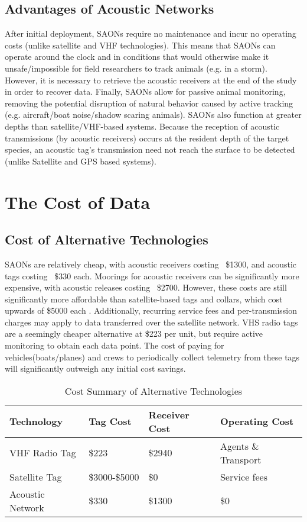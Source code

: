 \subsection{Advantages of Acoustic Networks}
After initial deployment, SAONs require no maintenance and incur no operating costs (unlike satellite and VHF technologies).  This means that SAONs can operate around the clock and in conditions that would otherwise make it unsafe/impossible for field researchers to track animals (e.g. in a storm)\cite{Heupel2006}.  However, it is necessary to retrieve the acoustic receivers at the end of the study in order to recover data\cite{Heupel2006}.  Finally, SAONs allow for passive animal monitoring, removing the potential disruption of natural behavior caused by active tracking (e.g. aircraft/boat noise/shadow scaring animals)\cite{Heupel2006}.  SAONs also function at greater depths than satellite/VHF-based systems.  Because the reception of acoustic transmissions (by acoustic receivers) occurs at the resident depth of the target species, an acoustic tag's transmission need not reach the surface to be detected (unlike Satellite and GPS based systems).

\section{The Cost of Data}
\subsection{Cost of Alternative Technologies}
SAONs are relatively cheap, with acoustic receivers costing ~\$1300, and acoustic tags costing ~\$330 each.  Moorings for acoustic receivers can be significantly more expensive, with acoustic releases costing ~\$2700.  However, these costs are still significantly more affordable than satellite-based tags and collars, which cost upwards of \$5000 each \cite{wildlifetracking}.  Additionally, recurring service fees and per-transmission charges may apply to data transferred over the satellite network.  VHS radio tags are a seemingly cheaper alternative at \$223 per unit, but require active monitoring to obtain each data point.  The cost of paying for vehicles(boats/planes) and crews to periodically collect telemetry from these tags will significantly outweigh any initial cost savings.

\begin{table}[h!]
		\begin{tabular}{l l l l}
Technology&Tag Cost&Receiver Cost&Operating Cost\\
\hline
			VHF Radio Tag		 & \$223\cite{telonicsFIS-550}           & \$2940\cite{telonicsTR-5}  & Agents \& Transport\\
			Satellite Tag 	     & \$3000-\$5000\cite{wildlifetracking}  & \$0    					  & Service fees\\
			Acoustic Network 	 & \$330         						 & \$1300 					  & \$0\\
		\end{tabular}
		\caption{Cost Summary of Alternative Technologies
			\label{CostAltTech}}
\end{table}

